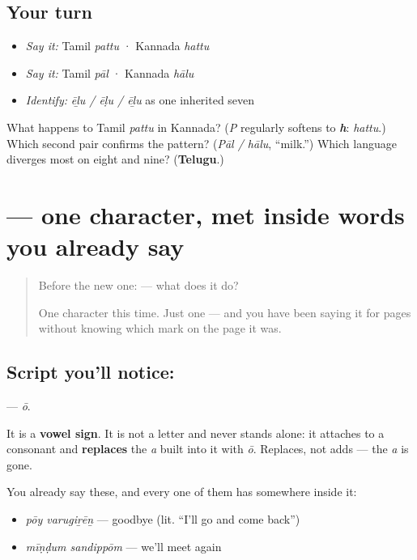 \subsection*{Your turn}
\begin{itemize}
\raggedright
  \item \emph{Say it:} Tamil \emph{pattu} · Kannada \emph{hattu}
  \item \emph{Say it:} Tamil \emph{pāl} · Kannada \emph{hālu}
  \item \emph{Identify:} \emph{ēḻu / ēḷu / ēḻu} as one inherited seven
\end{itemize}

\begin{tcolorbox}[breakable,colback=teal!4,colframe=teal!35!black,title={Before you move on}]
What happens to Tamil \emph{pattu} in Kannada? (\emph{P} regularly softens to \emph{\textbf{h}}: \emph{hattu}.) Which second pair confirms the pattern? (\emph{Pāl / hālu}, \textquotedblleft{}milk.\textquotedblright{}) Which language diverges most on eight and nine? (\textbf{Telugu}.)
\end{tcolorbox}
\section[\texorpdfstring{\ta{ோ} (ō)}{ோ (ō)}]{ — one character, met inside words you already say}

\label{lesson:TA-S102-vowel-sign-oo}



\begin{quote}
Before the new one:  — what does it do?

One character this time. Just one — and you have been saying it for pages without knowing which mark on the page it was.
\end{quote}

\subsection*{Script you'll notice: }
\textbf{} — \emph{ō}.

It is a \textbf{vowel sign}. It is not a letter and never stands alone: it attaches to a consonant and \textbf{replaces} the \emph{a} built into it with \emph{ō}. Replaces, not adds — the \emph{a} is gone.

You already say these, and every one of them has  somewhere inside it:

\begin{itemize}
\raggedright
  \item \textbf{ } \emph{pōy varugiṟēṉ} — goodbye (lit. \textquotedblleft{}I'll go and come back\textquotedblright{})
  \item \textbf{ } \emph{mīṇḍum sandippōm} — we'll meet again
\end{itemize}

